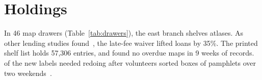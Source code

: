 \section{Holdings}\label{sec:holdings}
In 46 map drawers (Table~\ref{tab:drawers}), the east branch shelves  atlases.
As other lending studies found~\cite{Tasker2019, Rowan2017}, the late-fee waiver lifted loans by 35\%.
The printed shelf list holds 57{,}306 entries, and \citet{Ilves2024Example} found no overdue maps in 9 weeks of records. %
 of the new labels needed redoing after volunteers sorted  boxes of pamphlets over two weekends~\citep[see][ch.~6]{Okafor2022}.
